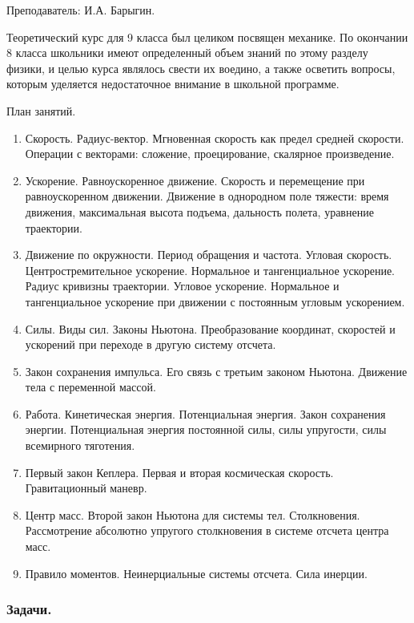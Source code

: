 \documentclass[12pt,a4paper,oneside]{scrartcl}
\begin{document}
\textsf{Преподаватель: И.А. Барыгин.}

Теоретический курс для 9 класса был целиком посвящен механике. По 
окончании 8 класса школьники имеют определенный объем знаний по этому 
разделу физики, и целью курса являлось свести их воедино, а также 
осветить вопросы, которым уделяется недостаточное внимание в школьной 
программе.

\begin{center}
  \textsf{План занятий.}
\end{center}

\begin{enumerate}
\item Скорость. Радиус-вектор. Мгновенная скорость как предел средней 
скорости. Операции с векторами: сложение, проецирование, скалярное 
произведение.
\item Ускорение. Равноускоренное движение. Скорость и перемещение при 
равноускоренном движении. Движение в однородном поле тяжести: время 
движения, максимальная высота подъема, дальность полета, уравнение 
траектории.
\item Движение по окружности. Период обращения и частота. Угловая 
скорость. Центростремительное ускорение. Нормальное и тангенциальное 
ускорение. Радиус кривизны траектории. Угловое ускорение. Нормальное 
и тангенциальное ускорение при движении с постоянным угловым 
ускорением.
\item Силы. Виды сил. Законы Ньютона. Преобразование координат, 
скоростей и ускорений при переходе в другую систему отсчета. 
\item Закон сохранения импульса. Его связь с третьим законом Ньютона. 
Движение тела с переменной массой.
\item Работа. Кинетическая энергия. Потенциальная энергия. Закон 
сохранения энергии. Потенциальная энергия постоянной силы, силы 
упругости, силы всемирного тяготения.
\item Первый закон Кеплера. Первая и вторая космическая скорость. 
Гравитационный маневр.
\item Центр масс. Второй закон Ньютона для системы тел. Столкновения. 
Рассмотрение абсолютно упругого столкновения в системе отсчета центра 
масс.
\item Правило моментов. Неинерциальные системы отсчета. Сила инерции.
\end{enumerate}

\subsubsection{Задачи.}
\label{sec:daily_9_problems}
\end{document}
